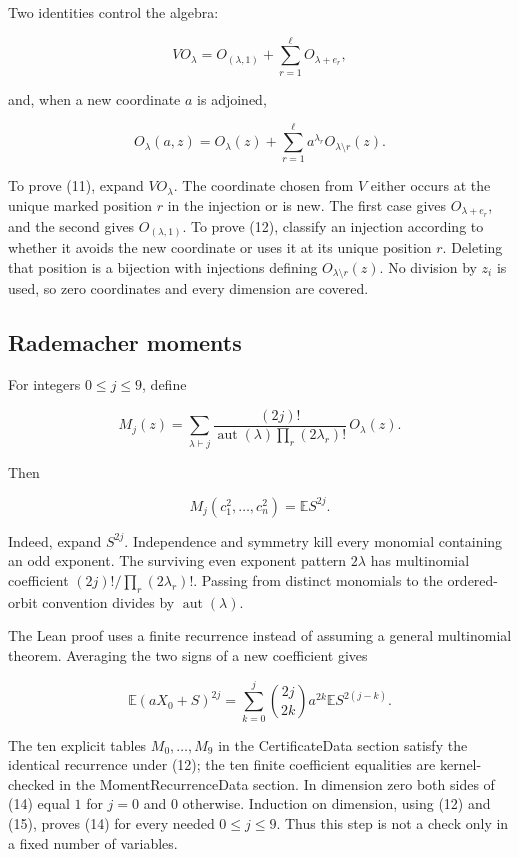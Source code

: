\documentclass[11pt]{article}
\begin{document}
Two identities control the algebra:

\[V O_\lambda=O_{(\lambda,1)}+\sum_{r=1}^{\ell}O_{\lambda+e_r}, \tag{11}\]

and, when a new coordinate \(a\) is adjoined,

\[O_\lambda(a,z)=O_\lambda(z)+
  \sum_{r=1}^{\ell}a^{\lambda_r}O_{\lambda\setminus r}(z). \tag{12}\]

To prove (11), expand \(V O_\lambda\). The coordinate chosen from \(V\)
either occurs at the unique marked position \(r\) in the injection or is
new. The first case gives \(O_{\lambda+e_r}\), and the second gives
\(O_{(\lambda,1)}\). To prove (12), classify an injection according to
whether it avoids the new coordinate or uses it at its unique position
\(r\). Deleting that position is a bijection with injections defining
\(O_{\lambda\setminus r}(z)\). No division by \(z_i\) is used, so zero
coordinates and every dimension are covered.

\subsection{Rademacher moments}\label{rademacher-moments}

For integers \(0\le j\le9\), define

\[M_j(z)=\sum_{\lambda\vdash j}
 \frac{(2j)!}{\operatorname{aut}(\lambda)\prod_r(2\lambda_r)!}\,O_\lambda(z). \tag{13}\]

Then

\[M_j(c_1^2,\ldots,c_n^2)=\mathbb E S^{2j}. \tag{14}\]

Indeed, expand \(S^{2j}\). Independence and symmetry kill every monomial
containing an odd exponent. The surviving even exponent pattern
\(2\lambda\) has multinomial coefficient \((2j)!/\prod_r(2\lambda_r)!\).
Passing from distinct monomials to the ordered-orbit convention divides
by \(\operatorname{aut}(\lambda)\).

The Lean proof uses a finite recurrence instead of assuming a general
multinomial theorem. Averaging the two signs of a new coefficient gives

\[\mathbb E(aX_0+S)^{2j}
 =\sum_{k=0}^j\binom{2j}{2k}a^{2k}\mathbb ES^{2(j-k)}. \tag{15}\]

The ten explicit tables \(M_0,\ldots,M_9\) in the CertificateData
section satisfy the identical recurrence under (12); the ten finite
coefficient equalities are kernel-checked in the MomentRecurrenceData
section. In dimension zero both sides of (14) equal \(1\) for \(j=0\)
and \(0\) otherwise. Induction on dimension, using (12) and (15), proves
(14) for every needed \(0\le j\le9\). Thus this step is not a check only
in a fixed number of variables.
\end{document}
